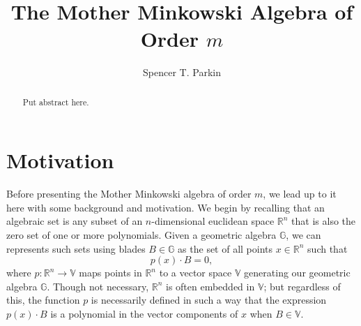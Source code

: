 \documentclass{ecgd-l}
\theoremstyle{definition}
\theoremstyle{remark}
\numberwithin{equation}{section}
\newcommand{\R}{\mathbb{R}}
\newcommand{\G}{\mathbb{G}}
\newcommand{\V}{\mathbb{V}}
\begin{document}
\title{The Mother Minkowski Algebra of Order $m$}

\author{Spencer T. Parkin}
\address{102 W. 500 S., Salt Lake City, UT  84101}



\begin{abstract}
Put abstract here.
\end{abstract}

\maketitle

\section{Motivation}

Before presenting the Mother Minkowski algebra of order $m$, we lead up to it here with
some background and motivation.  We begin by recalling that an algebraic set is any 
subset of an $n$-dimensional euclidean space $\R^n$ that is also the zero set of one
or more polynomials.  Given a geometric algebra $\G$, we can represents such sets
using blades $B\in\G$ as the set of all points $x\in\R^n$ such that
\begin{equation*}
p(x)\cdot B=0,
\end{equation*}
where $p:\R^n\to\V$ maps points in $\R^n$ to a vector space $\V$ generating
our geometric algebra $\G$.  Though not necessary, $\R^n$ is often embedded in $\V$;
but regardless of this, the function $p$ is necessarily defined in such a way that the expression
$p(x)\cdot B$ is a polynomial in the vector components of $x$ when $B\in\V$.
\end{document}
